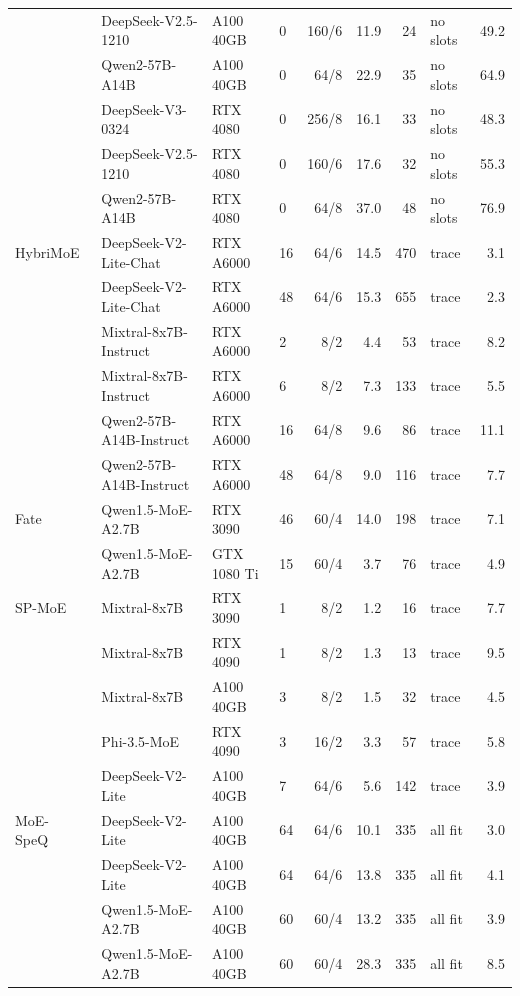 \begin{footnotesize}
\begin{longtable}{@{}p{}p{}p{}lrrrlr@{}}
 & DeepSeek-V2.5-1210 & A100 40GB & 0 & 160/6 & 11.9 & 24 & no slots & 49.2 \\
 & Qwen2-57B-A14B & A100 40GB & 0 & 64/8 & 22.9 & 35 & no slots & 64.9 \\
 & DeepSeek-V3-0324 & RTX 4080 & 0 & 256/8 & 16.1 & 33 & no slots & 48.3 \\
 & DeepSeek-V2.5-1210 & RTX 4080 & 0 & 160/6 & 17.6 & 32 & no slots & 55.3 \\
 & Qwen2-57B-A14B & RTX 4080 & 0 & 64/8 & 37.0 & 48 & no slots & 76.9 \\
HybriMoE~\cite{zhong2025hybrimoe} & DeepSeek-V2-Lite-Chat & RTX A6000 & 16 & 64/6 & 14.5 & 470 & trace & 3.1 \\
 & DeepSeek-V2-Lite-Chat & RTX A6000 & 48 & 64/6 & 15.3 & 655 & trace & 2.3 \\
 & Mixtral-8x7B-Instruct & RTX A6000 & 2 & 8/2 & 4.4 & 53 & trace & 8.2 \\
 & Mixtral-8x7B-Instruct & RTX A6000 & 6 & 8/2 & 7.3 & 133 & trace & 5.5 \\
 & Qwen2-57B-A14B-Instruct & RTX A6000 & 16 & 64/8 & 9.6 & 86 & trace & 11.1 \\
 & Qwen2-57B-A14B-Instruct & RTX A6000 & 48 & 64/8 & 9.0 & 116 & trace & 7.7 \\
Fate~\cite{fate2025} & Qwen1.5-MoE-A2.7B & RTX 3090 & 46 & 60/4 & 14.0 & 198 & trace & 7.1 \\
 & Qwen1.5-MoE-A2.7B & GTX 1080 Ti & 15 & 60/4 & 3.7 & 76 & trace & 4.9 \\
SP-MoE~\cite{spmoe} & Mixtral-8x7B & RTX 3090 & 1 & 8/2 & 1.2 & 16 & trace & 7.7 \\
 & Mixtral-8x7B & RTX 4090 & 1 & 8/2 & 1.3 & 13 & trace & 9.5 \\
 & Mixtral-8x7B & A100 40GB & 3 & 8/2 & 1.5 & 32 & trace & 4.5 \\
 & Phi-3.5-MoE & RTX 4090 & 3 & 16/2 & 3.3 & 57 & trace & 5.8 \\
 & DeepSeek-V2-Lite & A100 40GB & 7 & 64/6 & 5.6 & 142 & trace & 3.9 \\
MoE-SpeQ~\cite{moespeq} & DeepSeek-V2-Lite & A100 40GB & 64 & 64/6 & 10.1 & 335 & all fit & 3.0 \\
 & DeepSeek-V2-Lite & A100 40GB & 64 & 64/6 & 13.8 & 335 & all fit & 4.1 \\
 & Qwen1.5-MoE-A2.7B & A100 40GB & 60 & 60/4 & 13.2 & 335 & all fit & 3.9 \\
 & Qwen1.5-MoE-A2.7B & A100 40GB & 60 & 60/4 & 28.3 & 335 & all fit & 8.5 \\

\end{longtable}
\end{footnotesize}
